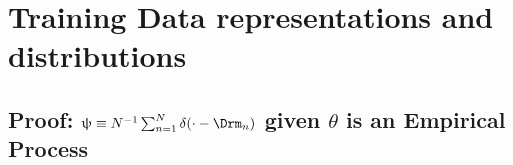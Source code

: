 \documentclass[12pt]{report}
\begin{document}
%
%
%
%
%
%
%






\section{Training Data representations and distributions} \label{app:data_dist_cont}


\subsection{Proof: $\uppsi \equiv N^{-1} \sum_{n=1}^N \delta(\cdot - \Drm_n)$ given $\theta$ is an Empirical Process}
\end{document}
